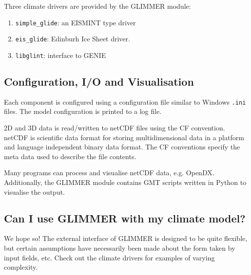 Three climate drivers are provided by the GLIMMER module:
\begin{enumerate}
 \item \texttt{simple\_glide}: an EISMINT type driver
 \item \texttt{eis\_glide}: Edinburh Ice Sheet driver. 
 \item \texttt{libglint}: interface to GENIE
\end{enumerate}

\subsection{Configuration, I/O and Visualisation}
Each component is configured using a configuration file similar to Windows \texttt{.ini} files. The model configuration is printed to a log file. 

2D and 3D data is read/written to netCDF files using the CF convention. netCDF is scientific data format for storing multidimensional data in a platform and language independent binary data format. The CF conventions specify the meta data used to describe the file contents.

Many programs can process and visualise netCDF data, e.g. OpenDX. Additionally, the GLIMMER module contains GMT scripts written in Python to visualise the output.

\subsection{Can I use GLIMMER with my climate model?}
We hope so! The external interface of GLIMMER is designed to be quite
flexible, but certain assumptions have necessarily been made about the form
taken by input fields, etc. Check out the climate drivers for examples of varying complexity.


